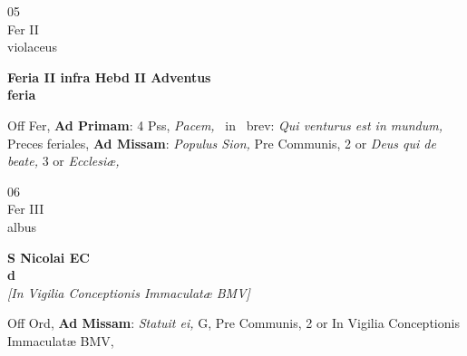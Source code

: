 \documentclass[10pt, openany]{book}
\begin{document}
        \begin{center}
            \begin{minipage}{3.5in}
                \vspace{2em}
                \begin{minipage}{0.5in}
                    {\Huge 05} \\
                    {\normalsize Fer II} \\
                    {\normalsize violaceus}
                \end{minipage}
                \begin{minipage}{3.0in}
                    \textbf{ \large Feria II infra Hebd II Adventus \\
                    \textnormal{\normalsize feria}} \\ 
                \end{minipage}
                \begin{justify}Off Fer, \textbf{Ad Primam}: 4 Pss, \textit{Pacem,} \Vbar\ in \Rbar\ brev: \textit{Qui venturus est in mundum,} Preces feriales, \textbf{Ad Missam}: \textit{Populus Sion,} Pre Communis, 2 or \textit{Deus qui de beate,} 3 or \textit{Ecclesiæ,}  
                \end{justify}
            \end{minipage}
        \end{center}
    
        \begin{center}
            \begin{minipage}{3.5in}
                \vspace{2em}
                \begin{minipage}{0.5in}
                    {\Huge 06} \\
                    {\normalsize Fer III} \\
                    {\normalsize albus}
                \end{minipage}
                \begin{minipage}{3.0in}
                    \textbf{ \large S Nicolai EC \\
                    \textnormal{\normalsize d}} \\ \textit{[In Vigilia Conceptionis Immaculatæ BMV]} \\ 
                \end{minipage}
                \begin{justify}Off Ord, \textbf{Ad Missam}: \textit{Statuit ei,} G, Pre Communis, 2 or In Vigilia Conceptionis Immaculatæ BMV,  
                \end{justify}
            \end{minipage}
        \end{center}
    
\end{document}

